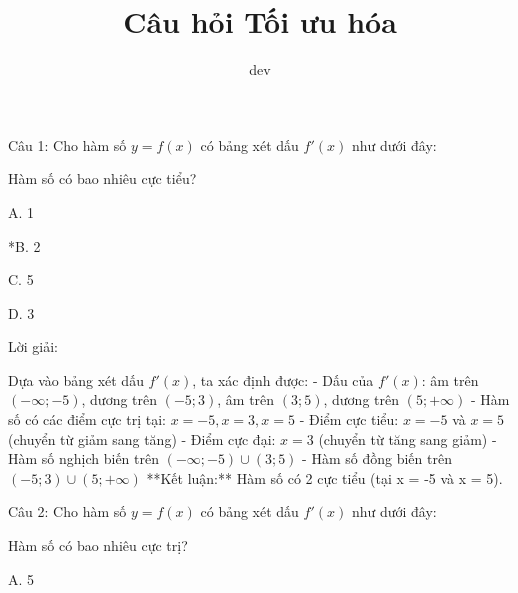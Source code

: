 \documentclass[a4paper,12pt]{article}
\begin{document}
\title{Câu hỏi Tối ưu hóa}
\author{dev}
\maketitle

Câu 1: Cho hàm số \(y=f(x)\) có bảng xét dấu \(f'(x)\) như dưới đây:


Hàm số có bao nhiêu cực tiểu?

A. 1

*B. 2

C. 5

D. 3

Lời giải:

Dựa vào bảng xét dấu \(f'(x)\), ta xác định được: - Dấu của \(f'(x)\): âm trên \((-\infty; -5)\), dương trên \((-5; 3)\), âm trên \((3; 5)\), dương trên \((5; +\infty)\) - Hàm số có các điểm cực trị tại: \(x = -5, x = 3, x = 5\) - Điểm cực tiểu: \(x = -5\) và \(x = 5\) (chuyển từ giảm sang tăng) - Điểm cực đại: \(x = 3\) (chuyển từ tăng sang giảm) - Hàm số nghịch biến trên \((-\infty; -5) \cup (3; 5)\) - Hàm số đồng biến trên \((-5; 3) \cup (5; +\infty)\) **Kết luận:** Hàm số có 2 cực tiểu (tại x = -5 và x = 5).



Câu 2: Cho hàm số \(y=f(x)\) có bảng xét dấu \(f'(x)\) như dưới đây:


Hàm số có bao nhiêu cực trị?

A. 5
\end{document}
